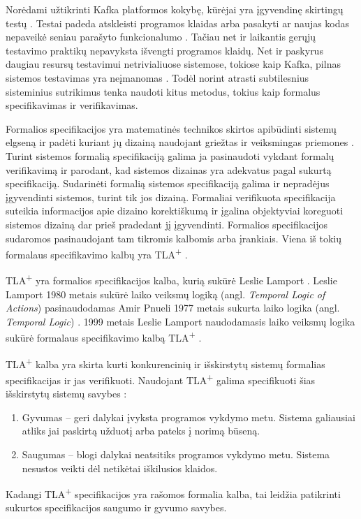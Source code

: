 \documentclass{VUMIFPSmagistrinis}
\begin{document}
		Norėdami užtikrinti Kafka platformos kokybę, kūrėjai yra įgyvendinę skirtingų testų \cite{kfkGH}.
		Testai padeda atskleisti programos klaidas arba pasakyti ar naujas kodas nepaveikė seniau parašyto funkcionalumo \cite{819971}.
		Tačiau net ir laikantis gerųjų testavimo praktikų nepavyksta išvengti programos klaidų.
		Net ir paskyrus daugiau resursų testavimui netrivialiuose sistemose, tokiose kaip Kafka, pilnas sistemos testavimas yra neįmanomas \cite{sullivan2004software}.
		Todėl norint atrasti subtilesnius sisteminius sutrikimus tenka naudoti kitus metodus, tokius kaip formalus specifikavimas ir verifikavimas.


		Formalios specifikacijos yra matematinės technikos skirtos apibūdinti sistemų elgseną ir padėti kuriant jų dizainą naudojant griežtas ir veiksmingas priemones \cite{holzmann1995improvement}.
		Turint sistemos formalią specifikaciją galima ja pasinaudoti vykdant formalų verifikavimą ir parodant, kad sistemos dizainas yra adekvatus pagal sukurtą specifikaciją.
		Sudarinėti formalią sistemos specifikaciją galima ir nepradėjus įgyvendinti sistemos, turint tik jos dizainą. 
		Formaliai verifikuota specifikacija suteikia informacijos apie dizaino korektiškumą ir įgalina objektyviai koreguoti sistemos dizainą dar prieš pradedant jį įgyvendinti.
		Formalios specifikacijos sudaromos pasinaudojant tam tikromis kalbomis arba įrankiais.
		Viena iš tokių formalaus specifikavimo kalbų yra TLA\textsuperscript{+} \cite{lamport2002specifying}.
		

		TLA\textsuperscript{+} yra formalios specifikacijos kalba, kurią sukūrė Leslie Lamport \cite{lamport2002specifying}.
		Leslie Lamport 1980 metais sukūrė laiko veiksmų logiką (angl. {\it Temporal Logic of Actions}) \cite{10.1145/177492.177726} pasinaudodamas Amir Pnueli 1977 metais sukurta laiko logika (angl. {\it Temporal Logic}) \cite{4567924}.
		1999 metais Leslie Lamport naudodamasis laiko veiksmų logika sukūrė formalaus specifikavimo kalbą TLA\textsuperscript{+} \cite{lamport2002specifying}.
		

TLA\textsuperscript{+} kalba yra skirta kurti konkurencinių ir išskirstytų sistemų formalias specifikacijas ir jas verifikuoti.
		Naudojant TLA\textsuperscript{+} galima specifikuoti šias išskirstytų sistemų savybes \cite{lamport2019safety}:
		\begin{enumerate}
			\item{Gyvumas -- geri dalykai įvyksta programos vykdymo metu. Sistema galiausiai atliks jai paskirtą užduotį arba pateks į norimą būseną.}
			\item{Saugumas -- blogi dalykai neatsitiks programos vykdymo metu. Sistema nesustos veikti dėl netikėtai iškilusios klaidos.}
		\end{enumerate}
		Kadangi TLA\textsuperscript{+} specifikacijos yra rašomos formalia kalba, tai leidžia patikrinti sukurtos specifikacijos saugumo ir gyvumo savybes.
		
\end{document}
